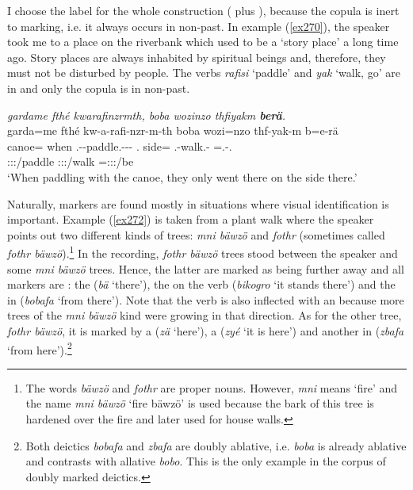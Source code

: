 I choose the label   for the whole construction (  plus ), because the copula is inert to  marking, i.e. it always occurs in non-past. In example (\ref{ex270}), the speaker took me to a place on the riverbank which used to be a `story place' a long time ago. Story places are always inhabited by spiritual beings and, therefore, they must not be disturbed by people. The verbs \emph{rafisi} `paddle' and \emph{yak} `walk, go' are in   and only the copula is in non-past.

\begin{exe}
	\ex \emph{gardame fthé kwarafinzrmth, boba wozinzo thfiyakm \textbf{berä}.}\\
	\glll garda=me fthé kw-a-rafi-nzr-m-th boba wozi=nzo thf-yak-m b=e-rä\\
	canoe=\Ins{} when \M.\Betaone-\Vc-paddle.\Ext-\Ndu-\Dur-\Stnsg{} \Med.\Abl{} side=\Only{} \Stnsg.\Betatwo-walk.\Ext-\Dur{} \Med=\Stnsg.\Alph-\Cop.\Ndu\\
	{} {} \footnotesize{\Stpl:\Sbj:\Pst:\Dur/paddle} {} {} \footnotesize{\Stpl:\Sbj:\Pst:\Dur/walk} \footnotesize{\Med=\Stpl:\Sbj:\Nonpast:\Ipfv/be}\\
	\trans `When paddling with the canoe, they only went there on the side there.'\\ 
	\label{ex270}
\end{exe}

Naturally,  markers are found mostly in situations where visual identification is important. Example (\ref{ex272}) is taken from a plant walk where the speaker points out two different kinds of trees: \emph{mni bäwzö} and \emph{fothr} (sometimes called \emph{fothr bäwzö}).\footnote{The words \emph{bäwzö} and \emph{fothr} are proper nouns. However, \emph{mni} means `fire' and the name \emph{mni bäwzö} `fire bäwzö' is used because the bark of this tree is hardened over the fire and later used for house walls.} In the recording, \emph{fothr bäwzö} trees stood between the speaker and some \emph{mni bäwzö} trees. Hence, the latter are marked as being further away and all  markers are : the  (\emph{bä} `there'), the  on the verb (\emph{bikogro} `it stands there') and the  in   (\emph{bobafa} `from there'). Note that the verb is also inflected with an  because more trees of the \emph{mni bäwzö} kind were growing in that direction. As for the other tree, \emph{fothr bäwzö}, it is marked by a   (\emph{zä} `here'), a    (\emph{zyé} `it is here') and another   in   (\emph{zbafa} `from here').\footnote{Both deictics \emph{bobafa} and \emph{zbafa} are doubly ablative, i.e. \emph{boba} is already ablative and contrasts with allative \emph{bobo}. This is the only example in the corpus of doubly marked deictics.}

